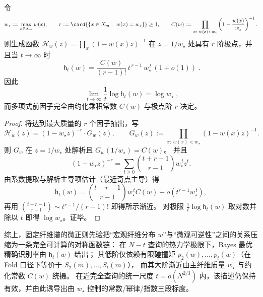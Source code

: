 \begin{theorem}\label{thm:pom-microcanonical-fold-dominant-pole-asymptotics}
令
\[
w_\star:=\max_{x\in X_m} w(x),
\qquad
r:=\card{\{x\in X_m:\ w(x)=w_\star\}}\ge 1,
\qquad
C(w):=\prod_{x:\ w(x)<w_\star}\left(1-\frac{w(x)}{w_\star}\right)^{-1}.
\]
则生成函数 \(\mathcal{H}_w(z)=\prod_x(1-w(x)z)^{-1}\) 在 \(z=1/w_\star\) 处具有 \(r\) 阶极点，并且当 \(t\to\infty\) 时
\[
\boxed{\;
\mathsf{h}_t(w)=\frac{C(w)}{(r-1)!}\,t^{\,r-1}\,w_\star^{\,t}\,(1+o(1))\; } .
\]
因此
\[
\boxed{\;
\lim_{t\to\infty}\frac{1}{t}\log \mathsf{h}_t(w)=\log w_\star\; } ,
\]
而多项式前因子完全由约化乘积常数 \(C(w)\) 与极点阶 \(r\) 决定。
\end{theorem}
\begin{proof}
将达到最大质量的 \(r\) 个因子抽出，写
\[
\mathcal{H}_w(z)=(1-w_\star z)^{-r}\cdot G_w(z),
\qquad
G_w(z):=\prod_{x:\ w(x)<w_\star}(1-w(x)z)^{-1}.
\]
则 \(G_w\) 在 \(z=1/w_\star\) 处解析且 \(G_w(1/w_\star)=C(w)\)。
并且
\[
(1-w_\star z)^{-r}=\sum_{t\ge 0}\binom{t+r-1}{r-1}w_\star^{\,t}z^t.
\]
由系数提取与解析主导项估计（最近奇点主导）得
\[
\mathsf{h}_t(w)=\binom{t+r-1}{r-1}w_\star^{\,t}C(w)+o\!\left(t^{r-1}w_\star^{\,t}\right),
\]
再用 \(\binom{t+r-1}{r-1}\sim t^{r-1}/(r-1)!\) 即得所示渐近。
对极限 \(\frac{1}{t}\log \mathsf{h}_t(w)\) 取对数并除以 \(t\) 即得 \(\log w_\star\)。证毕。
\end{proof}



综上，固定纤维谱的微正则先验把“宏观纤维分布 \(w\)”与“微观可逆性”之间的关系压缩为一条完全可计算的对称函数链：
在 \(N-t\) 查询的热力学极限下，Bayes 最优精确识别率由 \(\mathsf{h}_t(w)\) 给出；
其低阶仅依赖有限碰撞矩 \(p_2(w),\dots,p_t(w)\)（在 Fold 口径下等价于 \(S_2(m),\dots,S_t(m)\)），
而其大阶渐近由主纤维质量 \(w_\star\) 与约化常数 \(C(w)\) 统摄。
在近完全查询的统一尺度 \(t=o(N^{2/3})\) 内，该描述仍保持有效，并由此诱导出由 \(w_\star\) 控制的常数/幂律/指数三段标度。

\endinput

